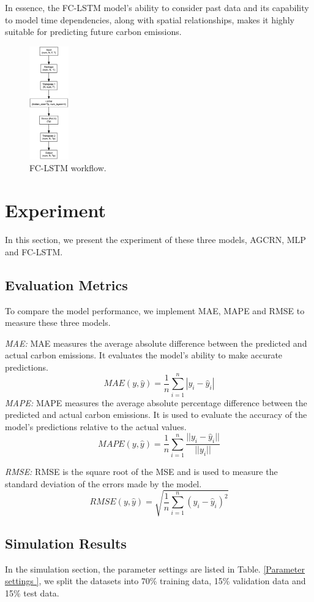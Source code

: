 \documentclass[sigconf, authordraft]{acmart}
\begin{document}
In essence, the FC-LSTM model's ability to consider past data and its capability to model time dependencies, along with spatial relationships, makes it highly suitable for predicting future carbon emissions.

\begin{figure}[ht]
	\centering
	\includegraphics[width=0.15\textwidth]{figures/FC-LSTM_flow.png}
	\caption{FC-LSTM workflow.}
	\label{fig:FC-LSTM_flow}
\end{figure}

\section{Experiment}


In this section, we present the experiment of these three models, AGCRN, MLP and
FC-LSTM.

\subsection{Evaluation Metrics }
To compare the model performance, we implement MAE, MAPE and RMSE to measure these
three models.

\emph{MAE:} MAE measures the average absolute difference between the predicted
and actual carbon emissions. It evaluates the model's ability to make accurate
predictions.
\[
	MAE(y, \hat{y}) = \frac{1}{n}\sum_{i=1}^{n}|y_{i}- \hat{y}_{i}|
\]
\emph{MAPE:} MAPE measures the average absolute percentage difference between the
predicted and actual carbon emissions. It is used to evaluate the accuracy of
the model's predictions relative to the actual values.
\[
	MAPE(y, \hat{y}) = \frac{1}{n}\sum_{i=1}^{n}\frac{||y_{i}- \hat{y}_{i}||}{||y_{i}||}
\]

\emph{RMSE:} RMSE is the square root of the MSE and is used to measure the
standard deviation of the errors made by the model.
\[
	RMSE(y, \hat{y}) = \sqrt{\frac{1}{n}\sum_{i=1}^{n}(y_{i}- \hat{y}_{i})^{2}}
\]
\subsection{Simulation Results}
In the simulation section, the parameter settings are listed in Table. \ref{Parameter
	settings
}, we split the datasets into 70\% training data, 15\% validation data and 15\%
test data.
\end{document}
